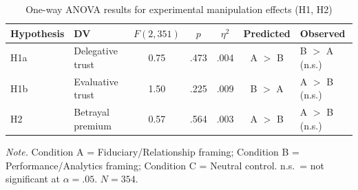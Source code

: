 \begin{table}[htbp]
\centering
\small
\caption{One-way ANOVA results for experimental manipulation effects (H1, H2)}
\label{tab:anova}
\begin{tabular}{llccccl}
\toprule
Hypothesis & DV & $F(2, 351)$ & $p$ & $\eta^2$ & Predicted & Observed \\
\midrule
H1a & Delegative trust  & 0.75 & .473 & .004 & A $>$ B & B $>$ A (n.s.) \\
H1b & Evaluative trust  & 1.50 & .225 & .009 & B $>$ A & A $>$ B (n.s.) \\
H2  & Betrayal premium  & 0.57 & .564 & .003 & A $>$ B & A $>$ B (n.s.) \\
\bottomrule
\end{tabular}
\begin{flushleft}
\footnotesize
\textit{Note.} Condition A = Fiduciary/Relationship framing; Condition B = Performance/Analytics framing; Condition C = Neutral control. n.s.\ = not significant at $\alpha = .05$. $N = 354$.
\end{flushleft}
\end{table}
